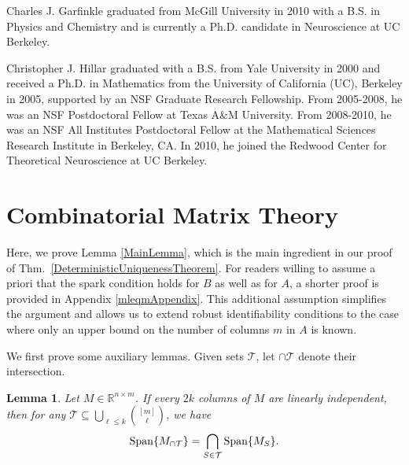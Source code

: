 \documentclass[journal, twocolumn]{IEEEtran}
\newtheorem{lemma}{Lemma}
\begin{document}



\vspace{-.5 cm}

\begin{IEEEbiographynophoto}{Charles J. Garfinkle}
graduated from McGill University in 2010 with a B.S. in Physics and Chemistry and is currently a Ph.D. candidate in Neuroscience at UC Berkeley.
\end{IEEEbiographynophoto}

\begin{IEEEbiographynophoto}{Christopher J. Hillar}
graduated with a B.S. from Yale University in 2000 and received a Ph.D. in Mathematics from the University of California (UC), Berkeley in 2005, supported by an NSF Graduate Research Fellowship.  From 2005-2008, he was an NSF Postdoctoral Fellow at Texas A\&M University. From 2008-2010, he was an NSF All Institutes Postdoctoral Fellow at the Mathematical Sciences Research Institute in Berkeley, CA.  In 2010, he joined the Redwood Center for Theoretical Neuroscience at UC Berkeley.  %
\end{IEEEbiographynophoto}

\clearpage

\appendices
\section{Combinatorial Matrix Theory}\label{appendixA}

Here, we prove Lemma \ref{MainLemma}, which is the main ingredient in our proof of Thm.~\ref{DeterministicUniquenessTheorem}. For readers willing to assume a priori that the spark condition holds for $B$ as well as for $A$, a shorter proof is provided in Appendix \ref{mleqmAppendix}. This additional assumption simplifies the argument and allows us to extend robust identifiability conditions to the case where only an upper bound on the number of columns $m$ in $A$ is known. 

We first prove some auxiliary lemmas. %
Given sets $\mathcal{T}$, let $\cap \mathcal{T}$ denote their intersection.

\begin{lemma}\label{SpanIntersectionLemma}
Let $M \in \mathbb{R}^{n \times m}$. If every $2k$ columns of $M$ are linearly independent, then for any $\mathcal{T} \subseteq \bigcup_{\ell \leq k} {[m] \choose \ell}$, we have
\begin{align}
\text{\rm Span}\{M_{\cap \mathcal{T}}\}  = \bigcap_{S \in \mathcal{T}} \text{\rm Span}\{M_S\}.
\end{align}
\end{lemma}
\end{document}
